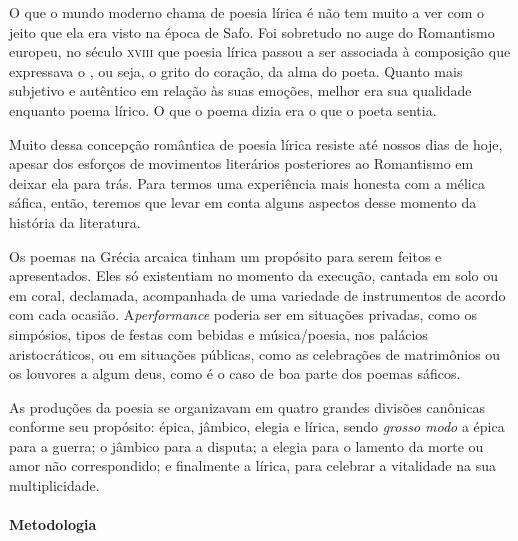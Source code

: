 \documentclass[12pt]{extarticle}
\begin{document}
O que o mundo moderno chama de poesia lírica é não tem muito a ver com
o jeito que ela era visto na época de Safo. Foi sobretudo no auge do
Romantismo europeu, no século \textsc{xviii} que poesia lírica passou a ser
associada à composição que expressava o , ou seja,
o grito do coração, da alma do poeta. Quanto mais subjetivo e autêntico
em relação às suas emoções, melhor era sua qualidade enquanto poema
lírico. O que o poema dizia era o que o poeta sentia. 

Muito dessa concepção romântica de poesia lírica resiste até nossos dias
de hoje, apesar dos esforços de movimentos literários posteriores ao Romantismo
em deixar ela para trás. Para termos uma experiência mais honesta com a mélica 
sáfica, então, teremos que levar em conta alguns aspectos desse momento da 
história da literatura.

Os poemas na Grécia arcaica tinham um propósito para serem feitos e apresentados. 
Eles só existentiam no momento da execução, cantada em solo ou em coral, 
declamada, acompanhada de uma variedade de instrumentos de acordo com cada ocasião. 
A\textit{performance} poderia ser em situações privadas, como os simpósios, tipos 
de festas com bebidas e música/poesia, nos palácios aristocráticos, ou em situações 
públicas, como as celebrações de matrimônios ou os louvores a algum deus, como é o
caso de boa parte dos poemas sáficos. 

As produções da poesia se organizavam em quatro grandes divisões canônicas conforme
seu propósito: épica, jâmbico, elegia e lírica, sendo \emph{grosso modo} a épica 
para a guerra; o jâmbico para a disputa; a elegia para o lamento da morte ou amor 
não correspondido; e finalmente a lírica, para celebrar a vitalidade na sua multiplicidade.

\paragraph{Metodologia} 
\end{document}
